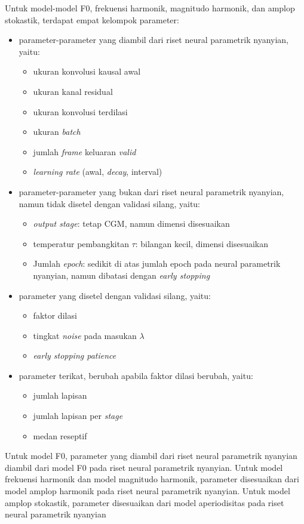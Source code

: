 Untuk model-model F0, frekuensi harmonik, magnitudo harmonik, dan amplop stokastik, terdapat empat kelompok parameter:
\begin{itemize}
	\item parameter-parameter yang diambil dari riset neural parametrik nyanyian, yaitu:
	\begin{itemize}
		\item ukuran konvolusi kausal awal
		\item ukuran kanal residual
		\item ukuran konvolusi terdilasi
		\item ukuran \textit{batch}
		\item jumlah \textit{frame} keluaran \textit{valid}
		\item \textit{learning rate} (awal, \textit{decay}, interval)
	\end{itemize}
	\item parameter-parameter yang bukan dari riset neural parametrik nyanyian, namun tidak disetel dengan validasi silang, yaitu:
	\begin{itemize}
		\item \textit{output stage}: tetap CGM, namun dimensi disesuaikan
		\item temperatur pembangkitan $\tau$: bilangan kecil, dimensi disesuaikan
		\item Jumlah \textit{epoch}: sedikit di atas jumlah epoch pada neural parametrik nyanyian, namun dibatasi dengan \textit{early stopping}
	\end{itemize}
	\item parameter yang disetel dengan validasi silang, yaitu:
	\begin{itemize}
		\item faktor dilasi
		\item tingkat \textit{noise} pada masukan $\lambda$
		\item \textit{early stopping patience}
	\end{itemize}
	\item parameter terikat, berubah apabila faktor dilasi berubah, yaitu:
	\begin{itemize}
		\item jumlah lapisan
		\item jumlah lapisan per \textit{stage}
		\item medan reseptif
	\end{itemize}
\end{itemize}

Untuk model F0, parameter yang diambil dari riset neural parametrik nyanyian diambil dari model F0 pada riset neural parametrik nyanyian. Untuk model frekuensi harmonik dan model magnitudo harmonik, parameter disesuaikan dari model amplop harmonik pada riset neural parametrik nyanyian. Untuk model amplop stokastik, parameter disesuaikan dari model aperiodisitas pada riset neural parametrik nyanyian

